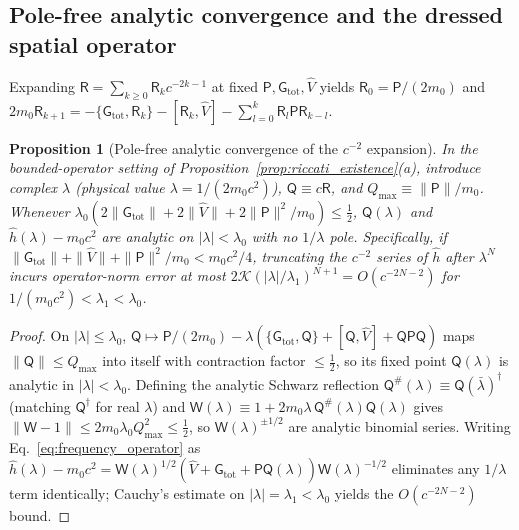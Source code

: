 \documentclass[aps,prd,onecolumn,tightenlines,nofootinbib,notitlepage,10pt,floatfix]{revtex4-2}
\theoremstyle{indentedtheorem}
\newtheorem{proposition}{Proposition}
\begin{document}
\subsection{Pole-free analytic convergence and the dressed spatial operator}
\label{sec:riccati_convergence}

Expanding $\mathsf{R}=\sum_{k\ge 0}\mathsf{R}_k c^{-2k-1}$ at fixed $\mathsf{P},\mathsf{G}_\text{tot},\hat{V}$ yields $\mathsf{R}_0=\mathsf{P}/(2m_0)$ and $2m_0\mathsf{R}_{k+1}=-\{\mathsf{G}_\text{tot},\mathsf{R}_k\}-[\mathsf{R}_k,\hat{V}]-\sum_{l=0}^k\mathsf{R}_l\mathsf{P}\mathsf{R}_{k-l}$.

\begin{proposition}[Pole-free analytic convergence of the $c^{-2}$ expansion]\label{prop:c2_convergence}
In the bounded-operator setting of Proposition~\ref{prop:riccati_existence}(a), introduce complex $\lambda$ (physical value $\lambda=1/(2m_0 c^2)$), $\mathsf{Q}\equiv c\mathsf{R}$, and $Q_{\max}\equiv\|\mathsf{P}\|/m_0$. Whenever $\lambda_0(2\|\mathsf{G}_\text{tot}\|+2\|\hat{V}\|+2\|\mathsf{P}\|^2/m_0)\le\tfrac{1}{2}$, $\mathsf{Q}(\lambda)$ and $\hat{h}(\lambda)-m_0 c^2$ are analytic on $|\lambda|<\lambda_0$ with no $1/\lambda$ pole. Specifically, if $\|\mathsf{G}_\text{tot}\|+\|\hat{V}\|+\|\mathsf{P}\|^2/m_0 < m_0 c^2/4$, truncating the $c^{-2}$ series of $\hat{h}$ after $\lambda^N$ incurs operator-norm error at most $2\mathcal{K}(|\lambda|/\lambda_1)^{N+1}=O(c^{-2N-2})$ for $1/(m_0 c^2)<\lambda_1<\lambda_0$.
\end{proposition}
\begin{proof}
On $|\lambda|\le\lambda_0$, $\mathsf{Q}\mapsto\mathsf{P}/(2m_0)-\lambda(\{\mathsf{G}_\text{tot},\mathsf{Q}\}+[\mathsf{Q},\hat{V}]+\mathsf{Q}\mathsf{P}\mathsf{Q})$ maps $\|\mathsf{Q}\|\le Q_{\max}$ into itself with contraction factor $\le\tfrac{1}{2}$, so its fixed point $\mathsf{Q}(\lambda)$ is analytic in $|\lambda|<\lambda_0$. Defining the analytic Schwarz reflection $\mathsf{Q}^\#(\lambda)\equiv\mathsf{Q}(\bar{\lambda})^\dagger$ (matching $\mathsf{Q}^\dagger$ for real $\lambda$) and $\mathsf{W}(\lambda)\equiv 1+2m_0\lambda\,\mathsf{Q}^\#(\lambda)\mathsf{Q}(\lambda)$ gives $\|\mathsf{W}-1\|\le 2m_0\lambda_0 Q_{\max}^2\le\tfrac{1}{2}$, so $\mathsf{W}(\lambda)^{\pm 1/2}$ are analytic binomial series. Writing Eq.~\eqref{eq:frequency_operator} as $\hat{h}(\lambda)-m_0 c^2=\mathsf{W}(\lambda)^{1/2}(\hat{V}+\mathsf{G}_\text{tot}+\mathsf{P}\mathsf{Q}(\lambda))\mathsf{W}(\lambda)^{-1/2}$ eliminates any $1/\lambda$ term identically; Cauchy's estimate on $|\lambda|=\lambda_1<\lambda_0$ yields the $O(c^{-2N-2})$ bound.
\end{proof}
\end{document}
